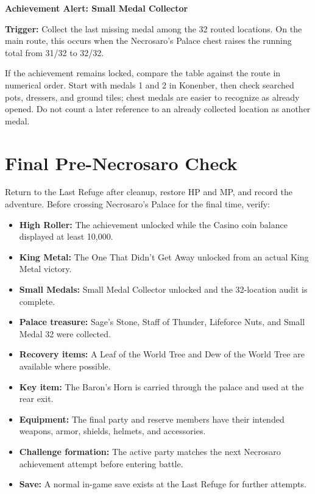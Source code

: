 \documentclass[
  american,
  10pt,
  letterpaper,
  oneside,
  open=any]{scrreprt}
\providecommand{\tightlist}{%
  \setlength{\itemsep}{0pt}\setlength{\parskip}{0pt}}
\begin{document}
\begin{achievementalert}

\textbf{Achievement Alert: Small Medal Collector}

\textbf{Trigger:} Collect the last missing medal among the 32 routed
locations. On the main route, this occurs when the Necrosaro's Palace
chest raises the running total from 31/32 to 32/32.

\end{achievementalert}

If the achievement remains locked, compare the table against the route
in numerical order. Start with medals 1 and 2 in Konenber, then check
searched pots, dressers, and ground tiles; chest medals are easier to
recognize as already opened. Do not count a later reference to an
already collected location as another medal.

\section{Final Pre-Necrosaro Check}\label{final-pre-necrosaro-check}

Return to the Last Refuge after cleanup, restore HP and MP, and record
the adventure. Before crossing Necrosaro's Palace for the final time,
verify:

\begin{itemize}
\tightlist
\item
  \textbf{High Roller:} The achievement unlocked while the Casino coin
  balance displayed at least 10,000.
\item
  \textbf{King Metal:} The One That Didn't Get Away unlocked from an
  actual King Metal victory.
\item
  \textbf{Small Medals:} Small Medal Collector unlocked and the
  32-location audit is complete.
\item
  \textbf{Palace treasure:} Sage's Stone, Staff of Thunder, Lifeforce
  Nuts, and Small Medal 32 were collected.
\item
  \textbf{Recovery items:} A Leaf of the World Tree and Dew of the World
  Tree are available where possible.
\item
  \textbf{Key item:} The Baron's Horn is carried through the palace and
  used at the rear exit.
\item
  \textbf{Equipment:} The final party and reserve members have their
  intended weapons, armor, shields, helmets, and accessories.
\item
  \textbf{Challenge formation:} The active party matches the next
  Necrosaro achievement attempt before entering battle.
\item
  \textbf{Save:} A normal in-game save exists at the Last Refuge for
  further attempts.
\end{itemize}
\end{document}
